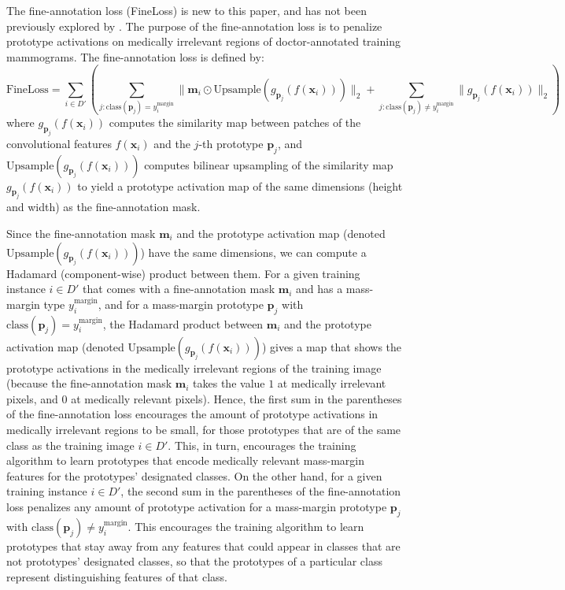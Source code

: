 \documentclass[11pt]{article}
\begin{document}
The fine-annotation loss (FineLoss) is new to this paper, and has not been previously explored by \cite{PPNet}. The purpose of the fine-annotation loss is to penalize prototype activations on medically irrelevant regions of doctor-annotated training mammograms. The fine-annotation loss is defined by:
\begin{equation}
\textrm{FineLoss} = \sum_{i \in D'}  \left(\sum_{j: \text{class}(\mathbf{p}_j) = y^{\text{margin}}_i} \|\mathbf{m}_i \odot \textrm{Upsample}(g_{\mathbf{p}_j}(f(\mathbf{x}_i)))\|_2
+ \sum_{j: \text{class}(\mathbf{p}_j) \neq y^{\text{margin}}_i} \|g_{\mathbf{p}_j}(f(\mathbf{x}_i))\|_2\right)
\end{equation}
where $g_{\mathbf{p}_j}(f(\mathbf{x}_i))$ computes the similarity map between patches of the convolutional features $f(\mathbf{x}_i)$ and the $j$-th prototype $\mathbf{p}_j$, and $\textrm{Upsample}(g_{\mathbf{p}_j}(f(\mathbf{x}_i)))$ computes bilinear upsampling of the similarity map $g_{\mathbf{p}_j}(f(\mathbf{x}_i))$ to yield a prototype activation map of the same dimensions (height and width) as the fine-annotation mask. 

Since the fine-annotation mask $\mathbf{m}_i$ and the prototype activation map (denoted $\textrm{Upsample}(g_{\mathbf{p}_j}(f(\mathbf{x}_i)))$) have the same dimensions, we can compute a Hadamard (component-wise) product between them. For a given training instance $i \in D'$ that comes with a fine-annotation mask $\mathbf{m}_i$ and has a mass-margin type $y^{\text{margin}}_i$, and for a mass-margin prototype $\mathbf{p}_j$ with $\text{class}(\mathbf{p}_j) = y^{\text{margin}}_i$, the Hadamard product between $\mathbf{m}_i$ and the prototype activation map (denoted $\textrm{Upsample}(g_{\mathbf{p}_j}(f(\mathbf{x}_i)))$) gives a map that shows the prototype activations in the medically irrelevant regions of the training image (because the fine-annotation mask $\mathbf{m}_i$ takes the value $1$ at medically irrelevant pixels, and $0$ at medically relevant pixels). Hence, the first sum in the parentheses of the fine-annotation loss encourages the amount of prototype activations in medically irrelevant regions to be small, for those prototypes that are of the same class as the training image $i \in D'$. This, in turn, encourages the training algorithm to learn prototypes that encode medically relevant mass-margin features for the prototypes' designated classes. On the other hand, for a given training instance $i \in D'$, the second sum in the parentheses of the fine-annotation loss penalizes any amount of prototype activation for a mass-margin prototype $\mathbf{p}_j$ with $\text{class}(\mathbf{p}_j) \neq y^{\text{margin}}_i$. This encourages the training algorithm to learn prototypes that stay away from any features that could appear in classes that are not prototypes' designated classes, so that the prototypes of a particular class represent distinguishing features of that class.
\end{document}
